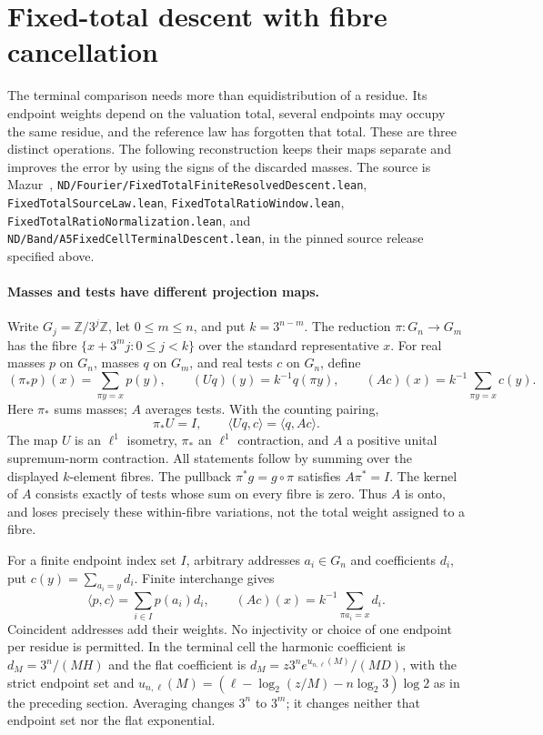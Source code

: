 \documentclass[11pt]{article}
\theoremstyle{remark}\newtheorem{remark}[proposition]{Remark}
\begin{document}
\section{Fixed-total descent with fibre cancellation}
\label{sec:mazur-descent}

The terminal comparison needs more than equidistribution of a residue.
Its endpoint weights depend on the valuation total, several endpoints
may occupy the same residue, and the reference law has forgotten that
total. These are three distinct operations. The following reconstruction
keeps their maps separate and improves the error by using the signs of
the discarded masses. The source is Mazur~\cite{Mazur2026v2},
\texttt{ND/Fourier/FixedTotalFiniteResolvedDescent.lean},
\texttt{FixedTotalSourceLaw.lean}, \texttt{FixedTotalRatioWindow.lean},
\texttt{FixedTotalRatioNormalization.lean}, and
\texttt{ND/Band/A5FixedCellTerminalDescent.lean}, in the pinned source
release specified above.

\paragraph{Masses and tests have different projection maps.}
Write $G_j=\mathbb Z/3^j\mathbb Z$, let $0\le m\le n$, and put
$k=3^{n-m}$. The reduction $\pi:G_n\to G_m$ has the fibre
$\{x+3^mj:0\le j<k\}$ over the standard representative $x$.
For real masses $p$ on $G_n$, masses $q$ on $G_m$, and real tests
$c$ on $G_n$, define
\begin{equation}
 (\pi_*p)(x)=\sum_{\pi y=x}p(y),\qquad
 (Uq)(y)=k^{-1}q(\pi y),\qquad
 (Ac)(x)=k^{-1}\sum_{\pi y=x}c(y).
 \label{eq:mazur-descent-maps}
\end{equation}
Here $\pi_*$ sums masses; $A$ averages tests. With the counting pairing,
\[
 \pi_*U=I,\qquad \langle Uq,c\rangle=\langle q,Ac\rangle.
\]
The map $U$ is an $\ell^1$ isometry, $\pi_*$ an $\ell^1$ contraction,
and $A$ a positive unital supremum-norm contraction.
All statements follow by summing over the displayed $k$-element fibres.
The pullback $\pi^*g=g\circ\pi$ satisfies $A\pi^*=I$.
The kernel of $A$ consists exactly of tests whose sum on every fibre
is zero. Thus $A$ is onto, and loses precisely these within-fibre
variations, not the total weight assigned to a fibre.

For a finite endpoint index set $I$, arbitrary addresses $a_i\in G_n$
and coefficients $d_i$, put $c(y)=\sum_{a_i=y}d_i$. Finite interchange gives
\[
 \langle p,c\rangle=\sum_{i\in I}p(a_i)d_i,\qquad
 (Ac)(x)=k^{-1}\sum_{\pi a_i=x}d_i.
\]
Coincident addresses add their weights. No injectivity or choice of one
endpoint per residue is permitted. In the terminal cell the harmonic
coefficient is $d_M=3^n/(MH)$ and the flat coefficient is
$d_M=z3^n e^{u_{n,\ell}(M)}/(MD)$, with the strict endpoint set
and $u_{n,\ell}(M)=(\ell-\log_2(z/M)-n\log_2 3)\log2$
as in the preceding section. Averaging changes $3^n$ to $3^m$;
it changes neither that endpoint set nor the flat exponential.
\end{document}
